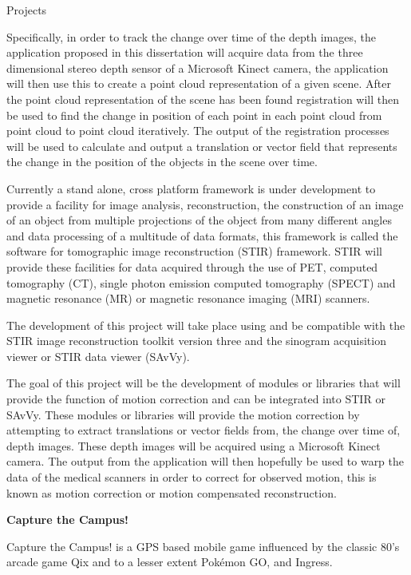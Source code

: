 \documentclass{cv}
\begin{document}
\begin{rSection}{Projects}
\item Specifically, in order to track the change over time of the depth images, the application proposed in this dissertation will acquire data from the three dimensional stereo depth sensor of a Microsoft Kinect camera, the application will then use this to create a point cloud representation of a given scene. After the point cloud representation of the scene has been found registration will then be used to find the change in position of each point in each point cloud from point cloud to point cloud iteratively. The output of the registration processes will be used to calculate and output a translation or vector field that represents the change in the position of the objects in the scene over time.

\item Currently a stand alone, cross platform framework is under development to provide a facility for image analysis, reconstruction, the construction of an image of an object from multiple projections of the object from many different angles and data processing of a multitude of data formats, this framework is called the software for tomographic image reconstruction (STIR) framework. STIR will provide these facilities for data acquired through the use of PET, computed tomography (CT), single photon emission computed tomography (SPECT) and magnetic resonance (MR) or magnetic resonance imaging (MRI) scanners.

\item The development of this project will take place using and be compatible with the STIR image reconstruction toolkit version three and the sinogram acquisition viewer or STIR data viewer (SAvVy).

\item The goal of this project will be the development of modules or libraries that will provide the function of motion correction and can be integrated into STIR or SAvVy. These modules or libraries will provide the motion correction by attempting to extract translations or vector fields from, the change over time of, depth images. These depth images will be acquired using a Microsoft Kinect camera. The output from the application will then hopefully be used to warp the data of the medical scanners in order to correct for observed motion, this is known as motion correction or motion compensated reconstruction.


{\bf Capture the Campus!} \hfill {\em} 
\item Capture the Campus! is a GPS based mobile game influenced by the classic 80’s arcade game Qix and to a lesser extent Pokémon GO, and Ingress.


\end{rSection}
\end{document}
